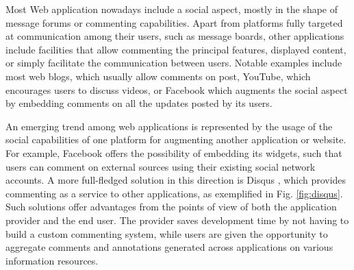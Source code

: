 
Most Web application nowadays include a social aspect, mostly in the shape of
message forums or commenting capabilities. Apart from platforms fully targeted
at communication among their users, such as message boards, other applications
include facilities that allow commenting the principal features, displayed
content, or simply facilitate the communication between users.  Notable
examples include most web blogs, which usually allow comments on post, YouTube,
which encourages users to discuss videos, or Facebook which augments the social
aspect by embedding comments on all the updates posted by its users.

An emerging trend among web applications is represented by the usage of the
social capabilities of one platform for augmenting another application or
website. For example, Facebook offers the possibility of embedding its widgets,
such that users can comment on external sources using their existing social
network accounts. A more full-fledged solution in this direction is Disqus
\cite{ref:disqus}, which provides commenting as a service to other
applications, as exemplified in Fig. \ref{fig:disqus}. Such solutions offer
advantages from the points of view of both the application provider and the end
user. The provider saves development time by not having to build a custom
commenting system, while users are given the opportunity to aggregate comments
and annotations generated across applications on various information resources.


